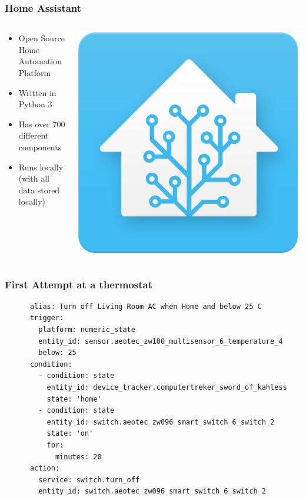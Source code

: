 \documentclass[aspectratio=169,11pt,hyperref={colorlinks=true}]{beamer}
\begin{document}
\begin{frame}
    \frametitle{Home Assistant}
    \begin{columns}
        \begin{column}{.48\textwidth}
            \begin{itemize}
                \item Open Source Home Automation Platform
                \item Written in Python 3
                \item Has over 700 different components
                \item Runs locally (with all data stored locally)
            \end{itemize}
        \end{column}
        \begin{column}{.48\textwidth}
            \includegraphics[width=\textwidth]{homeassistant.png}
        \end{column}
    \end{columns}
\end{frame}

\begin{frame}[fragile=singleslide]
    \frametitle{First Attempt at a thermostat}
    \begin{verbatim}
      alias: Turn off Living Room AC when Home and below 25 C
      trigger:
        platform: numeric_state
        entity_id: sensor.aeotec_zw100_multisensor_6_temperature_4
        below: 25
      condition:
        - condition: state
          entity_id: device_tracker.computertreker_sword_of_kahless
          state: 'home'
        - condition: state
          entity_id: switch.aeotec_zw096_smart_switch_6_switch_2
          state: 'on'
          for:
            minutes: 20
      action:
        service: switch.turn_off
        entity_id: switch.aeotec_zw096_smart_switch_6_switch_2
    \end{verbatim}
\end{frame}
\end{document}
